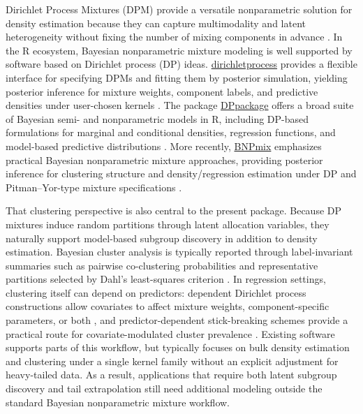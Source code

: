 \documentclass[article]{jss}\usepackage[]{graphicx}\usepackage[]{xcolor}
\begin{document}
Dirichlet Process Mixtures (DPM) provide a versatile nonparametric
solution for density estimation because they can capture multimodality
and latent heterogeneity without fixing the number of mixing components
in advance \citep{EscobarWest1995}. In the \textsf{R} ecosystem,
Bayesian nonparametric mixture modeling is well supported by software
based on Dirichlet process (DP) ideas.
\href{https://cran.r-project.org/package=dirichletprocess}{\textsf{dirichletprocess}}
provides a flexible interface for specifying DPMs and fitting them by
posterior simulation, yielding posterior inference for mixture weights,
component labels, and predictive densities under user-chosen kernels
\citep{dirichletprocess_pkg}. The package
\href{https://cran.r-project.org/package=DPpackage}{\textsf{DPpackage}}
offers a broad suite of Bayesian semi- and nonparametric models in
\textsf{R}, including DP-based formulations for marginal and conditional
densities, regression functions, and model-based predictive
distributions \citep{jara2011DPpackage}. More recently,
\href{https://cran.r-project.org/package=BNPmix}{\textsf{BNPmix}}
emphasizes practical Bayesian nonparametric mixture approaches,
providing posterior inference for clustering structure and
density/regression estimation under DP and Pitman--Yor-type mixture
specifications \citep{canale2021BNPmix}.

That clustering perspective is also central to the present package.
Because DP mixtures induce random partitions through latent allocation
variables, they naturally support model-based subgroup discovery in
addition to density estimation. Bayesian cluster analysis is typically
reported through label-invariant summaries such as pairwise
co-clustering probabilities \citep{Binder1978} and representative
partitions selected by Dahl's least-squares criterion \citep{Dahl2006}.
In regression settings, clustering itself can depend on predictors:
dependent Dirichlet process constructions allow covariates to affect
mixture weights, component-specific parameters, or both
\citep{MacEachern1999,MacEachern2000,DeIorio2004,Quintana2022}, and
predictor-dependent stick-breaking schemes provide a practical route for
covariate-modulated cluster prevalence \citep{Ren2011}. Existing
software supports parts of this workflow, but typically focuses on bulk
density estimation and clustering under a single kernel family without
an explicit adjustment for heavy-tailed data. As a result, applications
that require both latent subgroup discovery and tail extrapolation still
need additional modeling outside the standard Bayesian nonparametric
mixture workflow.
\end{document}
